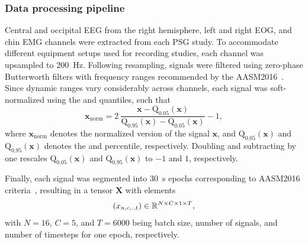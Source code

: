 \subsubsection{Data processing pipeline}
Central and occipital \ac{EEG} from the right hemisphere, left and right \ac{EOG}, and chin \ac{EMG} channels were extracted from each \ac{PSG} study. 
To accommodate different equipment setups used for recording studies, each channel was upsampled to \SI{200}{\hertz}. %
Following resampling, signals were filtered using zero-phase Butterworth filters with frequency ranges recommended by the \ac{AASM}2016~\cite{Berry2016}. %
Since dynamic ranges vary considerably across channels, each signal was soft-normalized using the  and  quantiles, such that 
\begin{equation}
    \mathbf{x}_{\mathrm{norm}} = 2~\frac{\mathbf{x} - \mathrm{Q}_{0.05}(\mathbf{x})}{\mathrm{Q}_{0.95}(\mathbf{x}) - \mathrm{Q}_{0.05}(\mathbf{x})} - 1,
\end{equation}
where $\mathbf{x}_{\mathrm{norm}}$ denotes the normalized version of the signal $\mathbf{x}$, and $\mathrm{Q}_{0.05}(\mathbf{x})$ and $\mathrm{Q}_{0.95}(\mathbf{x})$ denotes the  and  percentile, respectively.
Doubling and subtracting by one rescales $\mathrm{Q}_{0.05}(\mathbf{x})$ and $\mathrm{Q}_{0.95}(\mathbf{x})$ to $-1$ and $1$, respectively.

Finally, each signal was segmented into \SI{30}{\second} epochs corresponding to \ac{AASM}2016 criteria~\cite{Berry2016}, resulting in a tensor $\mathbf{X}$ with elements 
\begin{equation}
    (x_{n,c,\cdot,t}) \in \mathbb{R}^{N\times C\times 1 \times T},
\end{equation}
with $N=16$, $C=5$, and $T=6000$ being batch size, number of signals, and number of timesteps for one epoch, respectively. %

